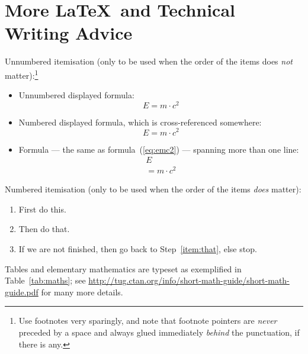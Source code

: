 \clearpage
\section*{More \LaTeX\ and Technical Writing Advice}

Unnumbered itemisation (only to be used when the order of the items
does \emph{not} matter):\footnote{Use footnotes very sparingly, and
  note that footnote pointers are \emph{never} preceded by a space and
  always glued immediately \emph{behind} the punctuation, if there is
  any.}
\begin{itemize}
\item Unnumbered displayed formula:
  \[
  E = m \cdot c^2
  \]
\item Numbered displayed formula, which is cross-referenced somewhere:
  \begin{equation}
    \label{eq:emc2}
    E = m \cdot c^2
  \end{equation}
\item Formula --- the same as formula~(\ref{eq:emc2}) --- spanning
  more than one line:
  \begin{gather*}
    E \\ = m \cdot c^2
  \end{gather*}
\end{itemize}
Numbered itemisation (only to be used when the order of the items
\emph{does} matter):
\begin{enumerate}
\item First do this.
\item\label{item:that} Then do that.
\item If we are not finished, then go back to Step~\ref{item:that},
  else stop.
\end{enumerate}

Tables and elementary mathematics are typeset as exemplified in
Table~\ref{tab:maths}; see
\url{http://tug.ctan.org/info/short-math-guide/short-math-guide.pdf}
for many more details.


